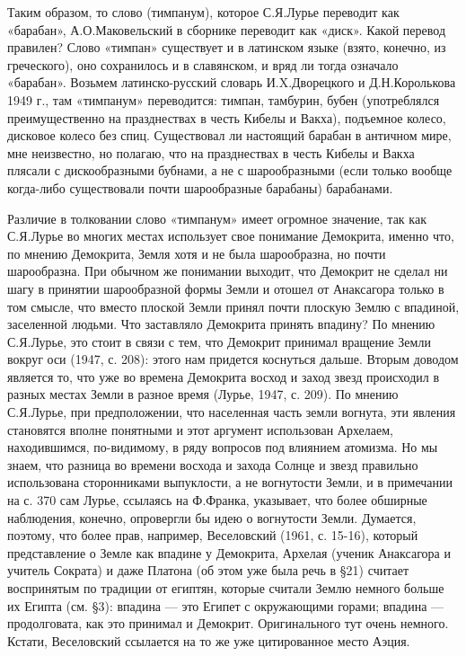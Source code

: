 Таким образом, то слово (тимпанум), которое С.Я.Лурье переводит как
«барабан», А.О.Маковельский в сборнике переводит как «диск». Какой
перевод правилен? Слово «тимпан» существует и в латинском языке
(взято, конечно, из греческого), оно сохранилось и в славянском, и
вряд ли тогда означало «барабан». Возьмем латинско-русский словарь
И.X.Дворецкого и Д.Н.Королькова 1949 г., там «тимпанум» переводится:
тимпан, тамбурин, бубен (употреблялся преимущественно на празднествах
в честь Кибелы и Вакха), подъемное колесо, дисковое колесо без спиц.
Существовал ли настоящий барабан в античном мире, мне неизвестно, но
полагаю, что на празднествах в честь Кибелы и Вакха плясали с
дискообразными бубнами, а не с шарообразными (если только вообще
когда-либо существовали почти шарообразные барабаны) барабанами.

Различие в толковании слово «тимпанум» имеет огромное значение, так
как С.Я.Лурье во многих местах использует свое понимание Демокрита,
именно что, по мнению Демокрита, Земля хотя и не была шарообразна, но
почти шарообразна. При обычном же понимании выходит, что Демокрит не
сделал ни шагу в принятии шарообразной формы Земли и отошел от
Анаксагора только в том смысле, что вместо плоской Земли принял почти
плоскую Землю с впадиной, заселенной людьми. Что заставляло Демокрита
принять впадину? По мнению С.Я.Лурье, это стоит в связи с тем, что
Демокрит принимал вращение Земли вокруг оси (1947, с. 208): этого нам
придется коснуться дальше. Вторым доводом является то, что уже во
времена Демокрита восход и заход звезд происходил в разных местах
Земли в разное время (Лурье, 1947, с. 209). По мнению С.Я.Лурье,
при предположении, что населенная часть земли вогнута, эти явления
становятся вполне понятными и этот аргумент использован Архелаем,
находившимся, по-видимому, в ряду вопросов под влиянием атомизма. Но
мы знаем, что разница во времени восхода и захода Солнце и звезд
правильно использована сторонниками выпуклости, а не вогнутости Земли,
и в примечании на с. 370 сам Лурье, ссылаясь на Ф.Франка, указывает,
что более обширные наблюдения, конечно, опровергли бы идею о
вогнутости Земли. Думается, поэтому, что более прав, например,
Веселовский (1961, с. 15-16), который представление о Земле как
впадине у Демокрита, Архелая (ученик Анаксагора и учитель Сократа) и
даже Платона (об этом уже была речь в §21) считает воспринятым по
традиции от египтян, которые считали Землю немного больше их Египта
(см. §3): впадина --- это Египет с окружающими горами; впадина ---
продолговата, как это принимал и Демокрит. Оригинального тут очень
немного. Кстати, Веселовский ссылается на то же уже цитированное место
Аэция.


